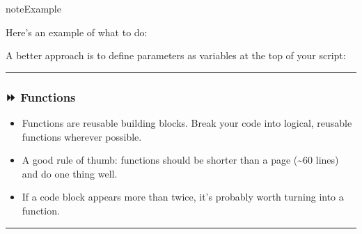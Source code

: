 \documentclass[letterpaper,10pt,english]{jupyterBook}
\begin{document}
\begin{sphinxadmonition}{note}{Example}

\sphinxAtStartPar
Here’s an example of what  to do:

\begin{sphinxVerbatim}[commandchars=\\\{\}]
   
\end{sphinxVerbatim}

\sphinxAtStartPar
A better approach is to define parameters as variables at the top of your script:

\begin{sphinxVerbatim}[commandchars=\\\{\}]
  

   
\end{sphinxVerbatim}
\end{sphinxadmonition}


\bigskip\hrule\bigskip



\subsubsection{⏩ Functions}
\label{\detokenize{chapters/02/02a_coding-best-practices:functions}}\begin{itemize}
\item {} 
\sphinxAtStartPar
{} Functions are reusable building blocks. Break your code into logical, reusable functions wherever possible.

\item {} 
\sphinxAtStartPar
A good rule of thumb: functions should be shorter than a page (\textasciitilde{}60 lines) and do one thing well.

\item {} 
\sphinxAtStartPar
If a code block appears more than twice, it’s probably worth turning into a function.

\end{itemize}


\bigskip\hrule\bigskip
\end{document}
